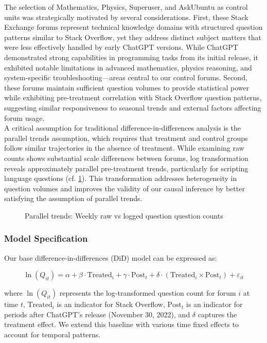 The selection of Mathematics, Physics, Superuser, and AskUbuntu as control units was strategically motivated by several considerations. First, these Stack Exchange forums represent technical knowledge domains with structured question patterns similar to Stack Overflow, yet they address distinct subject matters that were less effectively handled by early ChatGPT versions. While ChatGPT demonstrated strong capabilities in programming tasks from its initial release, it exhibited notable limitations in advanced mathematics, physics reasoning, and system-specific troubleshooting—areas central to our control forums. Second, these forums maintain sufficient question volumes to provide statistical power while exhibiting pre-treatment correlation with Stack Overflow question patterns, suggesting similar responsiveness to seasonal trends and external factors affecting forum usage.\\

A critical assumption for traditional difference-in-differences analysis is the parallel trends assumption, which requires that treatment and control groups follow similar trajectories in the absence of treatment. While examining raw counts shows substantial scale differences between forums, log transformation reveals approximately parallel pre-treatment trends, particularly for scripting language questions (cf. \ref{fig:paralle_trend_trans}). This transformation addresses heterogeneity in question volumes and improves the validity of our causal inference by better satisfying the assumption of parallel trends.

\begin{figure}[htpb!]
    \centering
    
    \caption{Parallel trends: Weekly raw vs logged question question counts}
    \label{fig:paralle_trend_trans}
\end{figure}

\subsubsection{Model Specification}
Our base difference-in-differences (DiD) model can be expressed as:

\begin{equation}
\ln(Q_{it}) = \alpha + \beta \cdot \text{Treated}_i + \gamma \cdot \text{Post}_t + \delta \cdot (\text{Treated}_i \times \text{Post}_t) + \varepsilon_{it}
\end{equation}

where $\ln(Q_{it})$ represents the log-transformed question count for forum $i$ at time $t$, $\text{Treated}_i$ is an indicator for Stack Overflow, $\text{Post}_t$ is an indicator for periods after ChatGPT's release (November 30, 2022), and $\delta$ captures the treatment effect. We extend this baseline with various time fixed effects to account for temporal patterns.\\

